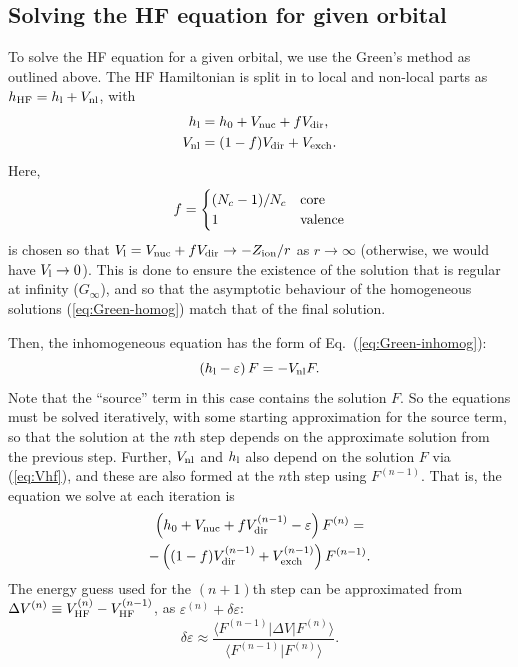 \documentclass[10pt,twocolumn,a4paper]{article}%
\newcommand{\bra}[1]{\ensuremath{\langle #1|}}	%
\newcommand{\ket}[1]{\ensuremath{|#1\rangle}}	%
\newcommand{\braket}[1]{\ensuremath{\langle #1\rangle}}	%
\newcommand{\be}{\begin{equation}}
\newcommand{\ee}{\end{equation}}
\def\en{\ensuremath{\varepsilon}}
\begin{document}
\subsection{Solving the HF equation for given orbital}\label{sec:hf-orbital}

To solve the HF equation for a given orbital, we use the Green's method as outlined above.
The HF Hamiltonian is split in to local and non-local parts as $h_{\rm HF} = h_{\rm l}+V_{\rm nl}$, with
\begin{align}
h_{\rm l} &= h_0 + V_{\rm nuc}+fV_{\rm dir},\\
V_{\rm nl} &= (1-f)V_{\rm dir}+V_{\rm exch}.
\end{align}
Here,
\be
f=
\begin{cases}
(N_c - 1)/N_c & {\rm core} \\
 1 & {\rm valence}
\end{cases}
\ee
is chosen so that $V_{\rm l} = V_{\rm nuc} +f V_{\rm dir}\to -Z_{\rm ion}/r$ as $r\to\infty$ (otherwise, we would have $V_{\rm l}\to0$).
This is done to ensure the existence of the solution that is regular at infinity ($G_\infty$), and so that the asymptotic behaviour of the homogeneous solutions (\ref{eq:Green-homog})  match that of the final solution.

Then, the inhomogeneous equation has the form of Eq.~(\ref{eq:Green-inhomog}):
\be
\left( h_{\rm l}- \en\right)F = -V_{\rm nl}F.
\ee
Note that the ``source'' term in this case contains the solution $F$. 
So the equations must be solved iteratively, with some starting approximation for the source term, so that the solution at the $n$th step depends on the approximate solution from the previous step.
Further, $V_{\rm nl}$ and $h_{\rm l}$ also depend on the solution $F$ via (\ref{eq:Vhf}), and these are also formed at the $n$th step using $F^{(n-1)}$.
That is, the equation we solve at each iteration is
\begin{multline}\label{eq:inhomog-HF}
\left( h_0 + V_{\rm nuc} + fV_{\rm dir}^{(n-1)} - \en\right)F^{(n)} =
\\
 -\left( (1-f)V_{\rm dir}^{(n-1)}+V_{\rm exch}^{(n-1)} \right)F^{(n-1)}.
\end{multline}
%
The energy guess used for the $(n+1)$th step can be approximated from $\Delta V^{(n)} \equiv V_{\rm HF}^{(n)} - V_{\rm HF}^{(n-1)}$, as $\en^{(n)}+\delta\en$:
\be
\delta\en \approx  \frac{\bra{F^{(n-1)}} \Delta V \ket{F^{(n)}}}{\braket{F^{(n-1)}|F^{(n)}}}.
\ee
\end{document}
